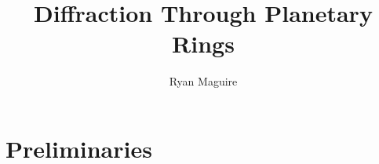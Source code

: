 \documentclass[oneside]{book}                                                 %
\begin{document}
    \title{Diffraction Through Planetary Rings}
    \author{Ryan Maguire}
    \date{\vspace{-5ex}}
    \maketitle
    \tableofcontents
    \listoffigures
    \listoftables
    \clearpage
    
    \clearpage
    \part{Preliminaries}
        
        
        
        
        \clearpage
        \printglossary[style=longpara]
\end{document}
